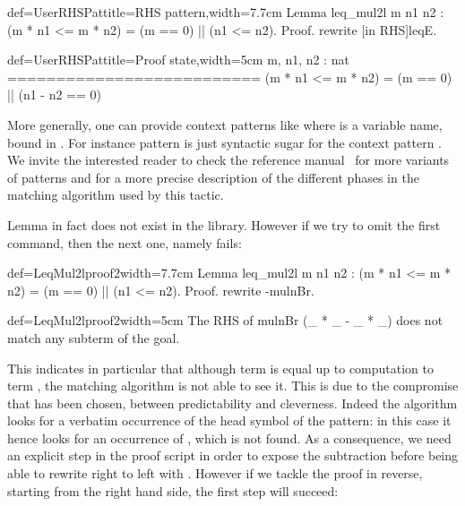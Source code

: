 \begin{coq}{def=UserRHSPat}{title=RHS pattern,width=7.7cm}
Lemma leq_mul2l m n1 n2 :
(m * n1 <= m * n2) = (m == 0) || (n1 <= n2).
Proof.
rewrite [in RHS]leqE.
\end{coq}
\begin{coqout}{def=UserRHSPat}{title=Proof state,width=5cm}
m, n1, n2 : nat
==========================
(m * n1 <= m * n2) =
(m == 0) || (n1 - n2 == 0)
\end{coqout}

More generally, one can provide context patterns like \C{[in X in T]}
where  is a variable name, bound in . For instance pattern
\C{[in RHS]} is just syntactic sugar for the context pattern
\C{[in X in _ = X]}.  We invite the interested reader to check the
reference manual~\cite[section 8]{ssrman} for more variants of patterns and for a
more precise description of the different phases in the matching
algorithm used by this tactic.

Lemma  in fact does not exist in the library.%
However if we
try to omit the first  command, then the next one,
namely  fails:

\begin{coq}{def=LeqMul2lproof2}{width=7.7cm}
Lemma leq_mul2l m n1 n2 :
(m * n1 <= m * n2) = (m == 0) || (n1 <= n2).
Proof.
rewrite -mulnBr.
\end{coq}
\begin{coqout}{def=LeqMul2lproof2}{width=5cm}
The RHS of mulnBr
  (_ * _ - _ * _)
does not match any subterm
of the goal.
\end{coqout}

This indicates in particular that although term 
is equal up to computation to term , the matching
algorithm is not able to see it. This is due to the compromise that
has been chosen, between predictability and cleverness. Indeed the
algorithm looks for a verbatim occurrence of the head symbol of the
pattern: in this case it hence looks for an occurrence of \C{(_ - _)},
which is not found. As a consequence, we need an explicit step in the
proof script in order to expose the subtraction before being able to
rewrite right to left with . However if we tackle the proof
in reverse, starting from the right hand side, the first 
step will succeed:

